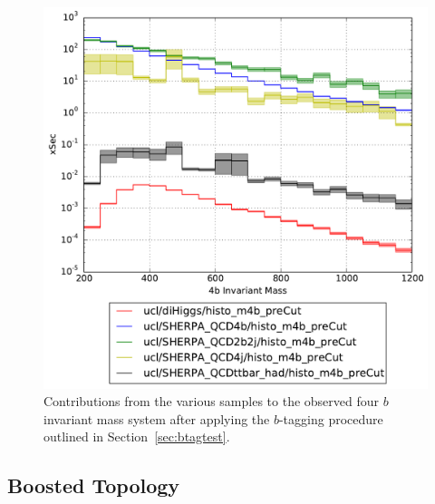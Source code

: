 \documentclass[12pt]{article}
\begin{document}
\begin{figure}[h!]
\begin{center}
\includegraphics[width=\textwidth]{plots/m4b_ucl_preCut.pdf}
\caption{Contributions from the various samples to the observed four $b$ invariant mass system after applying the $b$-tagging procedure outlined in Section~\ref{sec:btagtest}.}
\end{center}
\end{figure}

\subsection{Boosted Topology}\label{sec:Boosted_FR}
\end{document}
